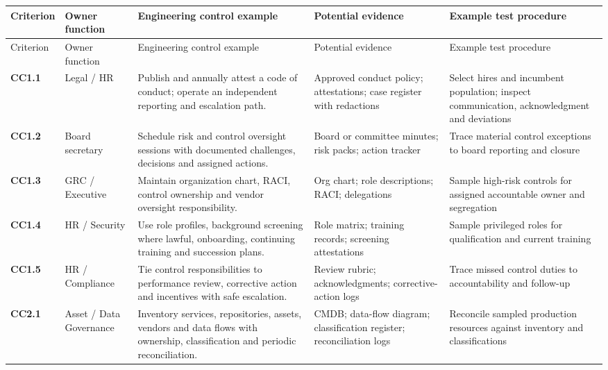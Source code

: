 \documentclass[10pt,oneside]{report}
\begin{document}
\begin{landscape}\scriptsize\setlength{\tabcolsep}{4pt}\renewcommand{\arraystretch}{1.16}
\begin{longtable}{@{}>{\raggedright\arraybackslash}p{0.6in}>{\raggedright\arraybackslash}p{1.0in}>{\raggedright\arraybackslash}p{2.5in}>{\raggedright\arraybackslash}p{2.35in}>{\raggedright\arraybackslash}p{2.20in}@{}}
\toprule Criterion & Owner function & Engineering control example & Potential evidence & Example test procedure \\ \midrule\endfirsthead
\toprule Criterion & Owner function & Engineering control example & Potential evidence & Example test procedure \\ \midrule\endhead
\textbf{CC1.1} & Legal / HR & Publish and annually attest a code of conduct; operate an independent reporting and escalation path. & Approved conduct policy; attestations; case register with redactions & Select hires and incumbent population; inspect communication, acknowledgment and deviations \\
\addlinespace[5pt]
\textbf{CC1.2} & Board secretary & Schedule risk and control oversight sessions with documented challenges, decisions and assigned actions. & Board or committee minutes; risk packs; action tracker & Trace material control exceptions to board reporting and closure \\
\addlinespace[5pt]
\textbf{CC1.3} & GRC / Executive & Maintain organization chart, RACI, control ownership and vendor oversight responsibility. & Org chart; role descriptions; RACI; delegations & Sample high-risk controls for assigned accountable owner and segregation \\
\addlinespace[5pt]
\textbf{CC1.4} & HR / Security & Use role profiles, background screening where lawful, onboarding, continuing training and succession plans. & Role matrix; training records; screening attestations & Sample privileged roles for qualification and current training \\
\addlinespace[5pt]
\textbf{CC1.5} & HR / Compliance & Tie control responsibilities to performance review, corrective action and incentives with safe escalation. & Review rubric; acknowledgments; corrective-action logs & Trace missed control duties to accountability and follow-up \\
\addlinespace[5pt]
\textbf{CC2.1} & Asset / Data Governance & Inventory services, repositories, assets, vendors and data flows with ownership, classification and periodic reconciliation. & CMDB; data-flow diagram; classification register; reconciliation logs & Reconcile sampled production resources against inventory and classifications \\

\end{longtable}
\end{landscape}
\end{document}
